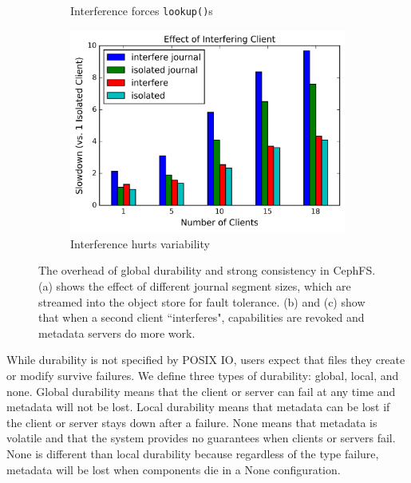 \begin{figure}[t]
\begin{subfigure}[b]{.3\linewidth}
      \caption{Interference forces \texttt{lookup()}s}
      \label{fig:overhead-b}
  \end{subfigure}
  \begin{subfigure}[b]{.3\linewidth}
      \centering
      \includegraphics[width=1.0\linewidth]{graphs/slowdown-interfere-scale.png}
      \caption{Interference hurts variability}
      \label{fig:overhead-c}
  \end{subfigure}
  \caption{The overhead of global durability and strong consistency in CephFS.
  (a) shows the effect of different journal segment sizes, which are streamed
  into the object store for fault tolerance. (b) and (c) show that when a second
  client ``interferes", capabilities are revoked and metadata servers do more
  work.  \label{fig:overhead}}
\end{figure}

While durability is not specified by POSIX IO, users expect that files they create
or modify survive failures.  We define three types of durability: global,
local, and none.  Global
durability means that the client or server can fail at any time and metadata
will not be lost. Local durability means that metadata can be lost if the
client or server stays down after a failure. None means that metadata is volatile
and that the system provides no guarantees when clients or servers fail. 
None is different than local durability because regardless of the type failure,
metadata will be lost when components die in a None configuration.\\


